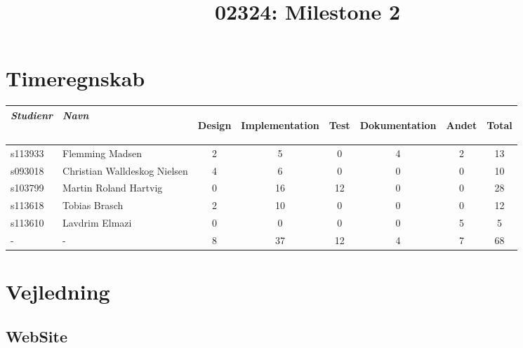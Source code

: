 \documentclass[a4paper]{article}
\title{02324: Milestone 2}
\author{
}
\begin{document}
\tableofcontents

\vspace{5cm}

\section{Timeregnskab} %
\label{sec:Timeregnskab}
\begin{tabular}{l l | c c c c c | c}

  \emph{Studienr} & \emph{Navn}
  & \begin{sideways}Design\end{sideways} 
  & \begin{sideways}Implementation\end{sideways} 
  & \begin{sideways}Test\end{sideways} 
  & \begin{sideways}Dokumentation\end{sideways} 
  & \begin{sideways}Andet\end{sideways} 
  & \begin{sideways}Total\end{sideways} \\
  \hline
  s113933 & Flemming Madsen              & 2 & 5  & 0  & 4 & 2 & 13 \\
  s093018 & Christian Walldeskog Nielsen & 4 & 6  & 0  & 0 & 0 & 10 \\
  s103799 & Martin Roland Hartvig        & 0 & 16 & 12 & 0 & 0 & 28 \\
  s113618 & Tobias Brasch                & 2 & 10 & 0  & 0 & 0 & 12 \\
  s113610 & Lavdrim Elmazi               & 0 & 0  & 0  & 0 & 5 & 5 \\
  \hline
  -       & -                            & 8 & 37 & 12 & 4 & 7 & 68
  
\end{tabular}


\clearpage



\section{Vejledning} %
\label{sec:Vejledning}

\subsection{WebSite} %
\label{sub:WebSite}
\end{document}
